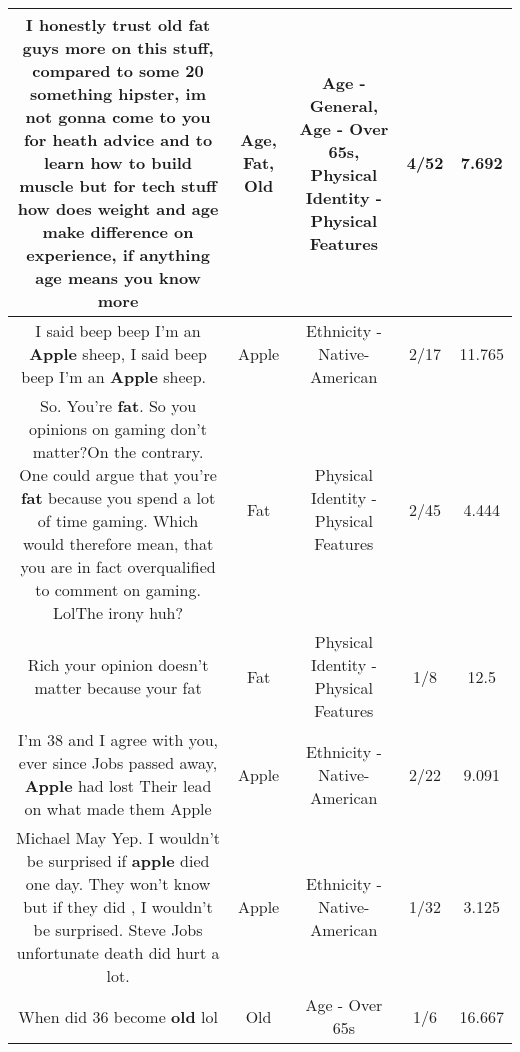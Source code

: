 \documentclass[11pt]{article}
\newlength\mylength
\begin{document}
\begin{center}
\begin{longtable}{|C{.65\mylength}|C{.30\mylength}|C{.12\mylength}|C{.12\mylength}|C{.12\mylength}|}
  \small I honestly trust \textbf{old} \textbf{fat} guys more on this stuff, compared to some 20 something hipster, im not gonna come to you for heath advice and to learn how to build muscle but for tech stuff how does weight and \textbf{age} make difference on experience, if anything \textbf{age} means you know more\normalsize   & Age, Fat, Old & Age - General, Age - Over 65s, Physical Identity - Physical Features & 4/52 & 7.692 \\  \hline
  \small I said beep beep I'm an \textbf{Apple} sheep, I said beep beep I'm an \textbf{Apple} sheep.🍎🐑\normalsize   & Apple & Ethnicity - Native-American & 2/17 & 11.765 \\  \hline
  \small So. You're \textbf{fat}. So you opinions on gaming don't matter?On the contrary. One could argue that you're \textbf{fat} because you spend a lot of time gaming. Which would therefore mean, that you are in fact overqualified to comment on gaming. LolThe irony huh?\normalsize   & Fat & Physical Identity - Physical Features & 2/45 & 4.444 \\  \hline
  \small Rich your opinion doesn't matter because your fat\normalsize   & Fat & Physical Identity - Physical Features & 1/8 & 12.5 \\  \hline
  \small I'm 38 and I agree with you, ever since Jobs passed away, \textbf{Apple} had lost Their lead on what made them Apple\normalsize   & Apple & Ethnicity - Native-American & 2/22 & 9.091 \\  \hline
  \small Michael May Yep. I wouldn't be surprised if \textbf{apple} died one day. They won't know but if they did , I wouldn't be surprised. Steve Jobs unfortunate death did hurt a lot.\normalsize   & Apple & Ethnicity - Native-American & 1/32 & 3.125 \\  \hline
  \small When did 36 become \textbf{old} lol\normalsize   & Old & Age - Over 65s & 1/6 & 16.667 \\  \hline

\end{longtable}
\end{center}
\end{document}
